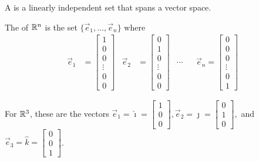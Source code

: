 


\begin{applicationActivities}



\begin{definition}
  A  is a linearly independent set that spans a vector space.

  \vspace{1em}

  The  of \(\mathbb{R}^n\) is the set \(\{\vec{e}_1, \ldots, \vec{e}_n\}\) where
  \begin{align*}
  \vec{e}_1 &= \begin{bmatrix}1 \\ 0 \\ 0 \\ \vdots \\ 0 \\  0 \end{bmatrix} &
  \vec{e}_2 &= \begin{bmatrix}0 \\ 1 \\ 0 \\ \vdots \\ 0 \\ 0 \end{bmatrix} &
  \cdots & &
  \vec{e}_n = \begin{bmatrix}0 \\ 0 \\ 0 \\ \vdots \\ 0 \\ 1 \end{bmatrix}
  \end{align*}

  \vspace{1em}

  For \(\mathbb{R}^3\), these are the vectors
  \(
    \vec e_1=\hat\imath=\begin{bmatrix}1 \\ 0 \\ 0\end{bmatrix},
    \vec e_2=\hat\jmath=\begin{bmatrix}0 \\ 1 \\ 0\end{bmatrix},
  \) and \(
    \vec e_3=\hat k=\begin{bmatrix}0 \\ 0 \\ 1\end{bmatrix}
  \).


\end{definition}
\end{applicationActivities}
